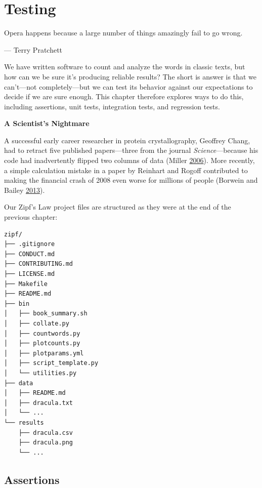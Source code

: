 \documentclass[
]{krantz}
\renewenvironment{quote}{\begin{VF}}{\end{VF}}
\begin{document}
\hypertarget{testing}{%
\chapter{Testing}\label{testing}}

\begin{quote}
Opera happens because a large number of things amazingly fail to go wrong.

--- Terry Pratchett
\end{quote}

We have written software to count and analyze the words in classic texts,
but how can we be sure it's producing reliable results?
The short is answer is that we can't---not completely---but
we can test its behavior against our expectations to decide if we are sure enough.
This chapter therefore explores ways to do this,
including assertions, unit tests, integration tests, and regression tests.

\begin{quote}
\textbf{A Scientist's Nightmare}

A successful early career researcher in protein crystallography,
Geoffrey Chang,
had to retract five published papers---three from
the journal \emph{Science}---because his code had
inadvertently flipped two columns of data (Miller \protect\hyperlink{ref-Miller2006}{2006}).
More recently, a simple calculation mistake in a paper by Reinhart and Rogoff
contributed to making the financial crash of 2008 even worse
for millions of people (Borwein and Bailey \protect\hyperlink{ref-Borw2013}{2013}).
\end{quote}

Our Zipf's Law project files are structured as they were at the end of the previous chapter:

\begin{verbatim}
zipf/
├── .gitignore
├── CONDUCT.md
├── CONTRIBUTING.md
├── LICENSE.md
├── Makefile
├── README.md
├── bin
│   ├── book_summary.sh
│   ├── collate.py
│   ├── countwords.py
│   ├── plotcounts.py
│   ├── plotparams.yml
│   ├── script_template.py
│   └── utilities.py
├── data
│   ├── README.md
│   ├── dracula.txt
│   └── ...
└── results
    ├── dracula.csv
    ├── dracula.png
    └── ...
\end{verbatim}

\hypertarget{testing-assertions}{%
\section{Assertions}\label{testing-assertions}}
\end{document}

